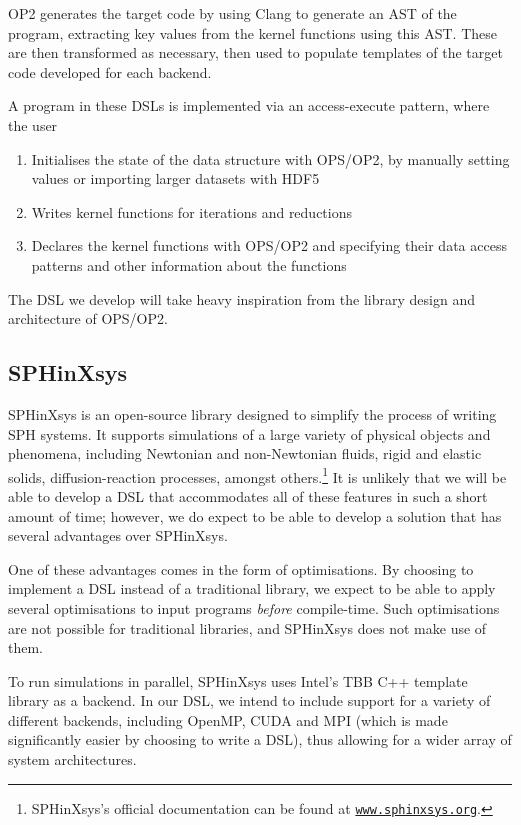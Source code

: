OP2 generates the target code by using Clang to generate an AST of the program, extracting key values from the kernel functions using this AST. These are then transformed as necessary, then used to populate templates of the target code developed for each backend.

A program in these DSLs is implemented via an access-execute pattern, where the user

\begin{enumerate}
    \item Initialises the state of the data structure with OPS/OP2, by manually setting values or importing larger datasets with HDF5

    \item Writes kernel functions for iterations and reductions

    \item Declares the kernel functions with OPS/OP2 and specifying their data access patterns and other information about the functions
\end{enumerate}

The DSL we develop will take heavy inspiration from the library design and architecture of OPS/OP2.

\subsection{SPHinXsys \cite{zhang2021sphinxsys}}

SPHinXsys is an open-source library designed to simplify the process of writing SPH systems. It supports simulations of a large variety of physical objects and phenomena, including Newtonian and non-Newtonian fluids, rigid and elastic solids, diffusion-reaction processes, amongst others.\footnote{SPHinXsys's official documentation can be found at \href{https://www.sphinxsys.org/}{\texttt{www.sphinxsys.org}}.} It is unlikely that we will be able to develop a DSL that accommodates all of these features in such a short amount of time; however, we do expect to be able to develop a solution that has several advantages over SPHinXsys.

One of these advantages comes in the form of optimisations. By choosing to implement a DSL instead of a traditional library, we expect to be able to apply several optimisations to input programs \textit{before} compile-time. Such optimisations are not possible for traditional libraries, and SPHinXsys does not make use of them.

To run simulations in parallel, SPHinXsys uses Intel's TBB C++ template library as a backend. In our DSL, we intend to include support for a variety of different backends, including OpenMP, CUDA and MPI (which is made significantly easier by choosing to write a DSL), thus allowing for a wider array of system architectures.

